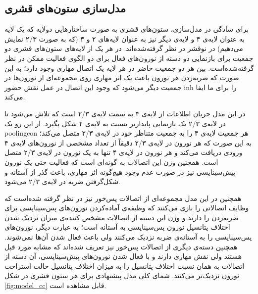 \documentclass[12pt]{report}
\begin{document}
	\subsection{مدل‌سازی ستون‌های قشری}
	
	برای سادگی در مدل‌سازی، ستون‌های قشری به صورت ساختارهایی دو‌لایه که یک لایه به عنوان لایه‌ی ۴ و لایه‌ی دیگر نیز به عنوان لایه‌‌های ۲ و ۳ (که به صورت ۲/۳ نمایش می‌دهیم) در نوقشر در نظر گرفته‌شده‌اند. در هر یک از لایه‌های ستون‌های قشری دو جمعیت برای بازنمایی دو دسته‌ از نورون‌های فعال برای دو الگوی فعالیت ممکن در نظر گرفته‌شده‌است. بین هر دو جمعیت حاضر در هر لایه یک اتصال مهاری وجود دارد؛ به این صورت که ضربه‌زدن هر نورون باعث یک اثر مهاری روی مجموعه‌ای از نورون‌ها در جمعیت دیگر می‌شود که وجود این اتصال در عمل نقش حضور \gls{inh} را برای ما ایفا می‌کند.
	
	در این مدل جریان اطلاعات از لایه‌ی ۴ به سمت لایه‌ی‌ ۲/۳ است که تلاش می‌شود تا در لایه‌ی ۲/۳ یک بازنمایی پایدار‌تر نسبت به لایه‌ی ۴ شکل بگیرد. از این رو یک \gls{poolingcon} هر جمعیت لایه‌ی ۴ را به جمعیت متناظر خود در لایه‌ی ۲/۳ متصل می‌کند؛ به این صورت که هر نورون در لایه‌ی ۲/۳ دقیقاً از تعداد مشخصی از نورون‌های لایه‌ی ۴ ورودی دریافت می‌کند و هر نورون در لایه‌ی ۴ تنها به یک نورون در لایه‌ی ۲/۳ متصل است. همچنین وزن این اتصالات به گونه‌ای است که فعالیت حتی یک نورون پیش‌سیناپسی نیز در صورت عدم وجود هیچ‌گونه اثر مهاری، باعث گذر از آستانه و شکل‌گرفتن ضربه در لایه‌ی ۲/۳ می‌شود. 
	
	همچنین در این مدل مجموعه‌ای از اتصالات پس‌خور نیز در نظر گرفته شده‌است که وظایف اتصالاتی را بازی می‌کنند که وظیفه‌ی آماده‌کردن نورون‌های پس‌سیناپسی برای ضربه‌زدن را دارند و وزن این دسته از اتصالات مشخص کننده‌ی میزان نزدیک شدن اختلاف پتانسیل نورون پس‌سیناپسی به آستانه است؛ به عبارت دیگر، نورون‌های پس‌سیناپسی را به آستانه‌ی ضربه نزدیک می‌کنند ولی باعث فعال شدن آن‌ها نمی‌شوند. همچنین دسته‌ی دیگری از اتصالات پس‌خور نیز تعریف شده‌اند که مشابه مورد قبل هستند ولی نقش مهاری دارند و با فعال شدن نورون‌های پیش‌سیناپسی، آن دسته از اتصالات به همان نسبت اختلاف پتانسیل را به میزان اختلاف پتانسیل حالت استراحت نورون نزدیک‌تر می‌کنند.
		شمای کلی مدل پیشنهادی برای هر ستون قشری در شکل \ref{fig:model_cc} قابل مشاهده است. 
	
\end{document}
